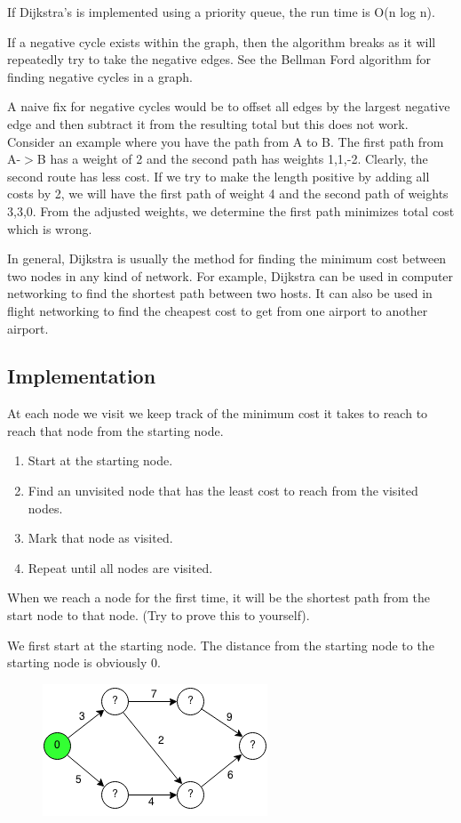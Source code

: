 \documentclass[11pt,oneside]{book}
\makeatletter
\def\maxwidth#1{\ifdim\Gin@nat@width>#1 #1\else\Gin@nat@width\fi}
\makeatother
\begin{document}
If Dijkstra's is implemented using a priority queue, the run time is O(n log n).

If a negative cycle exists within the graph, then the algorithm breaks as it will repeatedly try to take the negative edges. See the Bellman Ford algorithm for finding negative cycles in a graph.

A naive fix for negative cycles would be to offset all edges by the largest negative edge and then subtract it from the resulting total but this does not work. Consider an example where you have the path from A to B. The first path from A-$>$B has a weight of 2 and the second path has weights 1,1,-2. Clearly, the second route has less cost. If we try to make the length positive by adding all costs by 2, we will have the first path of weight 4 and the second path of weights 3,3,0. From the adjusted weights, we determine the first path minimizes total cost which is wrong.

In general, Dijkstra is usually the method for finding the minimum cost between two nodes in any kind of network. For example, Dijkstra can be used in computer networking to find the shortest path between two hosts. It can also be used in flight networking to find the cheapest cost to get from one airport to another airport.

\subsection{Implementation}

At each node we visit we keep track of the minimum cost it takes to reach to reach that node from the starting node.

\begin{enumerate}
\item Start at the starting node.
\item Find an unvisited node that has the least cost to reach from the visited nodes.
\item Mark that node as visited.
\item Repeat until all nodes are visited.
\end{enumerate}

When we reach a node for the first time, it will be the shortest path from the start node to that node. (Try to prove this to yourself).

We first start at the starting node. The distance from the starting node to the starting node is obviously 0.

\vspace{5px}\begin{figure}[H]\centering
        \includegraphics[width=0.66\maxwidth{\textwidth}]{djikstra.png}
        \end{figure}
\end{document}
